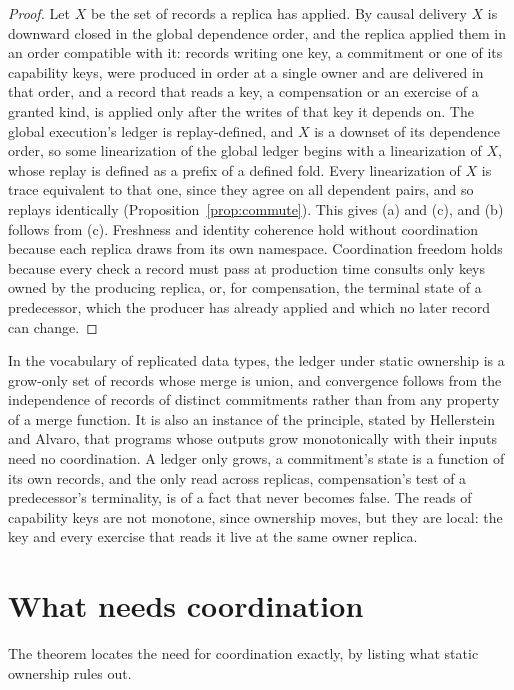\documentclass[11pt,openany]{book}
\theoremstyle{remark}
\begin{document}
\begin{proof}
Let $X$ be the set of records a replica has applied. By causal delivery
$X$ is downward closed in the global dependence order, and the replica
applied them in an order compatible with it: records writing one key,
a commitment or one of its capability keys, were produced in order at a
single owner and are delivered in that order, and a record that reads a
key, a compensation or an exercise of a granted kind, is applied only
after the writes of that key it depends on. The
global execution's ledger is replay-defined, and $X$ is a downset of its
dependence order, so some linearization of the global ledger begins with a
linearization of $X$, whose replay is defined as a prefix of a defined
fold. Every linearization of $X$ is trace equivalent to that one, since
they agree on all dependent pairs, and so replays identically
(Proposition~\ref{prop:commute}). This gives (a) and (c), and (b) follows
from (c). Freshness and identity coherence hold without coordination
because each replica draws from its own namespace. Coordination freedom
holds because every check a record must pass at production time consults
only keys owned by the producing replica, or, for compensation, the
terminal state of a predecessor, which the producer has already applied
and which no later record can change.
\end{proof}

In the vocabulary of replicated data types, the ledger under static
ownership is a grow-only set of records whose merge is union, and
convergence follows from the independence of records of distinct
commitments rather than from any property of a merge function. It is also
an instance of the principle, stated by Hellerstein and Alvaro, that
programs whose outputs grow monotonically with their inputs need no
coordination. A ledger only grows, a commitment's state is a function of
its own records, and the only read across replicas, compensation's test of
a predecessor's terminality, is of a fact that never becomes false. The
reads of capability keys are not monotone, since ownership moves, but they
are local: the key and every exercise that reads it live at the same
owner replica.

\section{What needs coordination}

The theorem locates the need for coordination exactly, by listing what
static ownership rules out.
\end{document}
